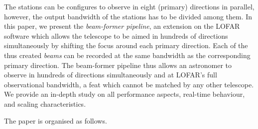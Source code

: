 \documentclass{llncs}
\begin{document}
The stations can be configures to observe in eight (primary) directions in parallel, however, the output bandwidth of the stations has to be divided among them. In this paper, we present the \emph{beam-former pipeline}, an extension on the LOFAR software which allows the telescope to be aimed in hundreds of directions simultaneously by shifting the focus around each primary direction. Each of the thus created \emph{beams} can be recorded at the same bandwidth as the corresponding primary direction. The beam-former pipeline thus allows an astronomer to observe in hundreds of directions simultaneously and at LOFAR's full observational bandwidth, a feat which cannot be matched by any other telescope. We provide an in-depth study on all performance aspects, real-time behaviour, and scaling characteristics.

The paper is organised as follows.
\end{document}
